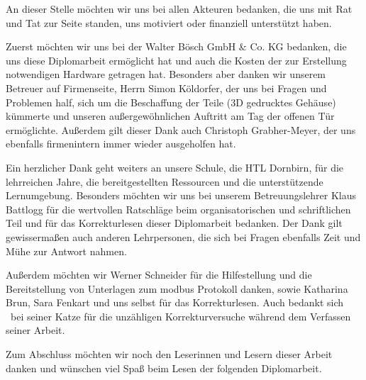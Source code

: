 \noindent An dieser Stelle möchten wir uns bei allen Akteuren bedanken, die uns mit Rat und Tat zur Seite standen, uns motiviert oder finanziell unterstützt haben.

Zuerst möchten wir uns bei der Walter Bösch GmbH \& Co. KG bedanken, die uns diese Diplomarbeit ermöglicht hat und auch die Kosten der zur Erstellung notwendigen Hardware getragen hat. Besonders aber danken wir unserem Betreuer auf Firmenseite, Herrn Simon Köldorfer, der uns bei Fragen und Problemen half, sich um die Beschaffung der Teile (\zB 3D gedrucktes Gehäuse) kümmerte und unseren außergewöhnlichen Auftritt am Tag der offenen Tür ermöglichte. Außerdem gilt dieser Dank auch Christoph Grabher-Meyer, der uns ebenfalls firmenintern immer wieder ausgeholfen hat.

Ein herzlicher Dank geht weiters an unsere Schule, die HTL Dornbirn, für die lehrreichen Jahre, die bereitgestellten Ressourcen und die unterstützende Lernumgebung. Besonders möchten wir uns bei unserem Betreuungslehrer Klaus Battlogg für die wertvollen Ratschläge beim organisatorischen und schriftlichen Teil und für das Korrekturlesen dieser Diplomarbeit bedanken. Der Dank gilt gewissermaßen auch anderen Lehrpersonen, die sich bei Fragen ebenfalls Zeit und Mühe zur Antwort nahmen.

Außerdem möchten wir Werner Schneider für die Hilfestellung und die Bereitstellung von Unterlagen zum \gls{modbus} Protokoll danken, sowie Katharina Brun, Sara Fenkart und uns selbst für das Korrekturlesen. Auch bedankt sich \pezze\ bei seiner Katze für die unzähligen Korrekturversuche während dem Verfassen seiner Arbeit.

Zum Abschluss möchten wir noch den Leserinnen und Lesern dieser Arbeit danken und wünschen viel Spaß beim Lesen der folgenden Diplomarbeit.